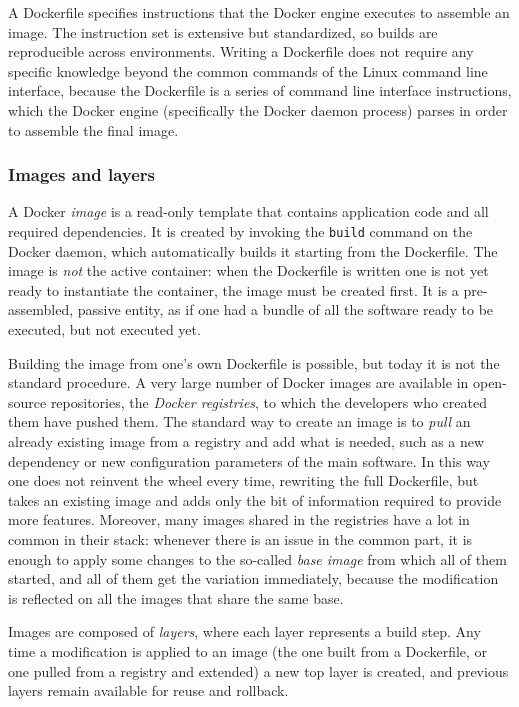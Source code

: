 A Dockerfile specifies instructions that the Docker engine executes to assemble an image. The instruction set is extensive but standardized, so builds are reproducible across environments. Writing a Dockerfile does not require any specific knowledge beyond the common commands of the Linux command line interface, because the Dockerfile is a series of command line interface instructions, which the Docker engine (specifically the Docker daemon process) parses in order to assemble the final image.

\subsubsection*{Images and layers}

A Docker \emph{image} is a read-only template that contains application code and all required dependencies. It is created by invoking the \texttt{build} command on the Docker daemon, which automatically builds it starting from the Dockerfile. The image is \emph{not} the active container: when the Dockerfile is written one is not yet ready to instantiate the container, the image must be created first. It is a pre-assembled, passive entity, as if one had a bundle of all the software ready to be executed, but not executed yet.

Building the image from one's own Dockerfile is possible, but today it is not the standard procedure. A very large number of Docker images are available in open-source repositories, the \emph{Docker registries}, to which the developers who created them have pushed them. The standard way to create an image is to \emph{pull} an already existing image from a registry and add what is needed, such as a new dependency or new configuration parameters of the main software. In this way one does not reinvent the wheel every time, rewriting the full Dockerfile, but takes an existing image and adds only the bit of information required to provide more features. Moreover, many images shared in the registries have a lot in common in their stack: whenever there is an issue in the common part, it is enough to apply some changes to the so-called \emph{base image} from which all of them started, and all of them get the variation immediately, because the modification is reflected on all the images that share the same base.

Images are composed of \emph{layers}, where each layer represents a build step. Any time a modification is applied to an image (the one built from a Dockerfile, or one pulled from a registry and extended) a new top layer is created, and previous layers remain available for reuse and rollback.

